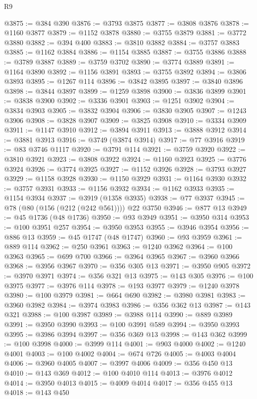 \begin{lexlean}{R9}
\begin{coremodule}
@3875 := @384 @390
@3876 := @3793 @3875
@3877 := @3808 @3876
@3878 := @1160 @3877
@3879 := @1152 @3878
@3880 := @3755 @3879
@3881 := @3772 @3880
@3882 := @394 @400
@3883 := @3810 @3882
@3884 := @3757 @3883
@3885 := @1162 @3884
@3886 := @1154 @3885
@3887 := @3755 @3886
@3888 := @3789 @3887
@3889 := @3759 @3702
@3890 := @3774 @3889
@3891 := @1164 @3890
@3892 := @1156 @3891
@3893 := @3755 @3892
@3894 := @3806 @3893
@3895 := @1267 @114
@3896 := @3842 @3895
@3897 := @3840 @3896
@3898 := @3844 @3897
@3899 := @1259 @3898
@3900 := @3836 @3899
@3901 := @3838 @3900
@3902 := @3336 @3901
@3903 := @1251 @3902
@3904 := @3834 @3903
@3905 := @3832 @3904
@3906 := @3830 @3905
@3907 := @1243 @3906
@3908 := @3828 @3907
@3909 := @3825 @3908
@3910 := @3334 @3909
@3911 := @1147 @3910
@3912 := @3894 @3911
@3913 := @3888 @3912
@3914 := @3881 @3913
@3916 := @3749 (@3874 @3914)
@3917 := @77 @3916
@3919 := @83 @3746 @1117
@3920 := @3791 @114
@3921 := @3759 @3920
@3922 := @3810 @3921
@3923 := @3808 @3922
@3924 := @1160 @3923
@3925 := @3776 @3924
@3926 := @3774 @3925
@3927 := @1152 @3926
@3928 := @3793 @3927
@3929 := @1158 @3928
@3930 := @1150 @3929
@3931 := @1164 @3930
@3932 := @3757 @3931
@3933 := @1156 @3932
@3934 := @1162 @3933
@3935 := @1154 @3934
@3937 := @3919 (@1358 @3935)
@3938 := @77 @3937
@3945 := @78 (@80 (@156 (@212 (@242 @561)))) @22 @3750
@3946 := @877 @13
@3949 := @45 @1736 (@48 @1736)
@3950 := @93 @3949
@3951 := @3950 @314
@3953 := @100 @3951 @257
@3954 := @3950 @3953
@3955 := @3946 @3954
@3956 := @886 @13
@3959 := @45 @1747 (@48 @1747)
@3960 := @93 @3959
@3961 := @889 @114
@3962 := @250 @3961
@3963 := @1240 @3962
@3964 := @100 @3963
@3965 := @699 @700
@3966 := @3964 @3965
@3967 := @3960 @3966
@3968 := @3956 @3967
@3970 := @356 @305 @13
@3971 := @3950 @905
@3972 := @3970 @3971
@3974 := @356 @321 @13
@3975 := @143 @305
@3976 := @100 @3975
@3977 := @3976 @114
@3978 := @193 @3977
@3979 := @1240 @3978
@3980 := @100 @3979
@3981 := @664 @690
@3982 := @3980 @3981
@3983 := @3960 @3982
@3984 := @3974 @3983
@3986 := @356 @362 @13
@3987 := @143 @321
@3988 := @100 @3987
@3989 := @3988 @114
@3990 := @889 @3989
@3991 := @3950 @3990
@3993 := @100 @3991 @589
@3994 := @3950 @3993
@3995 := @3986 @3994
@3997 := @356 @369 @13
@3998 := @143 @362
@3999 := @100 @3998
@4000 := @3999 @114
@4001 := @903 @4000
@4002 := @1240 @4001
@4003 := @100 @4002
@4004 := @674 @726
@4005 := @4003 @4004
@4006 := @3960 @4005
@4007 := @3997 @4006
@4009 := @356 @450 @13
@4010 := @143 @369
@4012 := @100 @4010 @114
@4013 := @3976 @4012
@4014 := @3950 @4013
@4015 := @4009 @4014
@4017 := @356 @455 @13
@4018 := @143 @450

\end{coremodule}
\end{lexlean}
